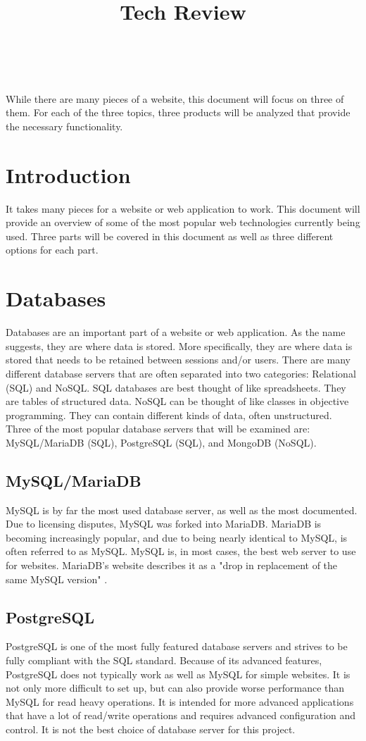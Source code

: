 \documentclass[10pt,draftclsnofoot,onecolumn,journal,compsoc]{IEEEtran}
\title{Tech Review}
\author{
  \IEEEauthorblockN{Matthew Kottre} \\
  \IEEEauthorblockA{Group 13: Student Letter of Recommendation}
}
\begin{document}
\maketitle
While there are many pieces of a website, this document will focus on three of them. For each of the three topics, three products will be analyzed that provide the necessary functionality.

\newpage
\tableofcontents
\newpage

\section{Introduction}
It takes many pieces for a website or web application to work. This document will provide an overview of some of the most popular web technologies currently being used. Three parts will be covered in this document as well as three different options for each part.

\section{Databases}
Databases are an important part of a website or web application. As the name suggests, they are where data is stored. More specifically, they are where data is stored that needs to be retained between sessions and/or users. There are many different database servers that are often separated into two categories: Relational (SQL) and NoSQL. SQL databases are best thought of like spreadsheets. They are tables of structured data. NoSQL can be thought of like classes in objective programming. They can contain different kinds of data, often unstructured. Three of the most popular database servers that will be examined are: MySQL/MariaDB (SQL), PostgreSQL (SQL), and MongoDB (NoSQL).

\subsection{MySQL/MariaDB}
MySQL is by far the most used database server, as well as the most documented. Due to licensing disputes, MySQL was forked into MariaDB. MariaDB is becoming increasingly popular, and due to being nearly identical to MySQL, is often referred to as MySQL. MySQL is, in most cases, the best web server to use for websites. MariaDB's website describes it as a "drop in replacement of the same MySQL version" \cite{mariadb}.

\subsection{PostgreSQL}
PostgreSQL is one of the most fully featured database servers and strives to be fully compliant with the SQL standard. Because of its advanced features, PostgreSQL does not typically work as well as MySQL for simple websites. It is not only more difficult to set up, but can also provide worse performance than MySQL for read heavy operations. It is intended for more advanced applications that have a lot of read/write operations and requires advanced configuration and control. It is not the best choice of database server for this project.
\end{document}
